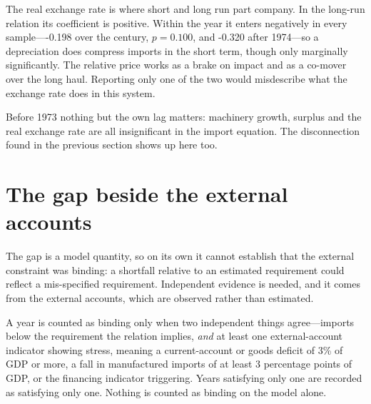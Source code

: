 \documentclass[11pt]{article}
\begin{document}
The real exchange rate is where short and long run part company. In the long-run relation its coefficient is positive. Within the year it enters negatively in every sample----0.198 over the century, $p = 0.100$, and -0.320 after 1974---so a depreciation does compress imports in the short term, though only marginally significantly. The relative price works as a brake on impact and as a co-mover over the long haul. Reporting only one of the two would misdescribe what the exchange rate does in this system.

Before 1973 nothing but the own lag matters: machinery growth, surplus and the real exchange rate are all insignificant in the import equation. The disconnection found in the previous section shows up here too.

\FloatBarrier
\section{The gap beside the external accounts}

The gap is a model quantity, so on its own it cannot establish that the external constraint was binding: a shortfall relative to an estimated requirement could reflect a mis-specified requirement. Independent evidence is needed, and it comes from the external accounts, which are observed rather than estimated.

A year is counted as binding only when two independent things agree---imports below the requirement the relation implies, \emph{and} at least one external-account indicator showing stress, meaning a current-account or goods deficit of 3\% of GDP or more, a fall in manufactured imports of at least 3 percentage points of GDP, or the financing indicator triggering. Years satisfying only one are recorded as satisfying only one. Nothing is counted as binding on the model alone.
\end{document}
